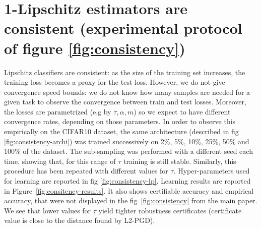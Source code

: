 \section{1-Lipschitz estimators are consistent (experimental protocol of figure \ref{fig:consistency})}\label{ap:consistency}

    Lipschitz classifiers are consistent: as the size of the training set increases, the training loss becomes a proxy for the test loss. However, we do not give convergence speed bounds: we do not know how many samples are needed for a given task to observe the convergence between train and test losses. Moreover, the losses are parametrized (e.g by $\tau,\alpha,m$) so we expect to have different convergence rates, depending on those parameters. In order to observe this empirically on the CIFAR10 dataset, the same architecture (described in fig \ref{fig:consistency-archi}) was trained successively on 2\%, 5\%, 10\%, 25\%, 50\% and 100\% of the dataset. The sub-sampling was performed with a different seed each time, showing that, for this range of $\tau$ training is still stable. Similarly, this procedure has been repeated with different values for $\tau$. Hyper-parameters used for learning are reported in fig \ref{fig:consistency-lp}. Learning results are reported in Figure~\ref{fig:consitency-results}. It also shows certifiable accuracy and empirical accuracy, that were not displayed in the fig~\ref{fig:consistency} from the main paper. We see that lower values for $\tau$ yield tighter robustness certificates (certificate value is close to the distance found by L2-PGD).

